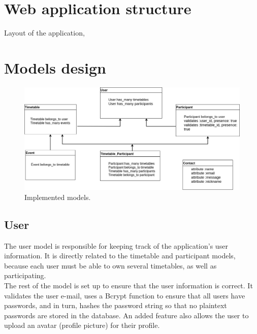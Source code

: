 \section{Web application structure}
\vspace{-5mm}
Layout of the application, 



\newpage

\section{Models design}
\vspace{-5mm}
\begin{figure}[H]
	\centering
    \includegraphics[trim={0 0 0 0},clip,width=1\textwidth]{Files/Models.jpg}
    \caption{Implemented models.\cite{draw:io}}
    \label{fig: Models}
\end{figure}

\subsection{User}
\vspace{-5mm}
The user model is responsible for keeping track of the application's user information. It is directly related to the timetable and participant models, because each user must be able to own several timetables, as well as participating.\\ 
The rest of the model is set up to ensure that the user information is correct. It validates the user e-mail, uses a Bcrypt function to ensure that all users have passwords, and in turn, hashes the password string so that no plaintext passwords are stored in the database. An added feature also allows the user to upload an avatar (profile picture) for their profile. \cite{wiki:RoR}

